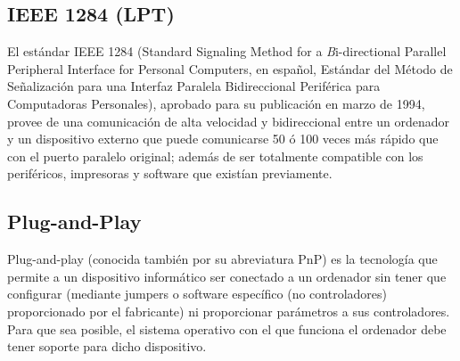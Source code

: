 \documentclass[12pt,oneside,a4paper]{article}
\begin{document}
	\subsection{IEEE 1284 (LPT)}\label{sub:ieee 1284 (lpt)}
		
		El estándar IEEE 1284 (Standard Signaling Method for a {\emph Bi-directional
		Parallel Peripheral Interface for Personal Computers}, en español,
		Estándar del Método de Señalización para una Interfaz Paralela
		Bidireccional Periférica para Computadoras Personales), aprobado para
		su publicación en marzo de 1994, provee de una comunicación de alta
		velocidad y bidireccional entre un ordenador y un dispositivo externo
		que puede comunicarse 50 ó 100 veces más rápido que con el puerto
		paralelo original; además de ser totalmente compatible con los
		periféricos, impresoras y software que existían previamente.

		\cite{LPT}

	\subsection{Plug-and-Play}\label{sub:plug-and-play}
	
		Plug-and-play (conocida también por su abreviatura PnP) es la
		tecnología que permite a un dispositivo informático ser conectado a un
		ordenador sin tener que configurar (mediante jumpers o software
		específico (no controladores) proporcionado por el fabricante) ni
		proporcionar parámetros a sus controladores. Para que sea posible, el
		sistema operativo con el que funciona el ordenador debe tener soporte
		para dicho dispositivo.

		\cite{plugandplay}

\newpage

\listoffigures

\clearpage

\end{document}
